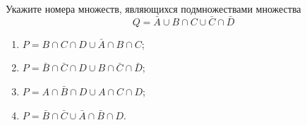 \question
Укажите номера множеств, являющихся подмножествами множества
\begin{equation*}
	Q = \bar{A} \cup B \cap C \cup \bar{C} \cap \bar{D}
\end{equation*}

\begin{enumerate}
	\renewcommand{\labelenumi}{\arabic{enumi})}
	\item $P = B \cap C \cap D \cup \bar{A} \cap B \cap C$;
	\item $P = \bar{B} \cap \bar{C} \cap D \cup B \cap \bar{C} \cap \bar{D}$;
	\item $P = A \cap \bar{B} \cap D \cup A \cap C \cap D$;
	\item $P = \bar{B} \cap \bar{C} \cup \bar{A} \cap \bar{B} \cap D$.
\end{enumerate}
